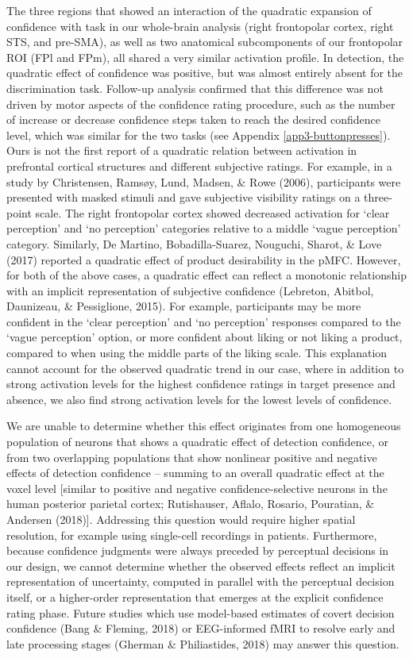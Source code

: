 \documentclass[12pt,twoside]{reedthesis}
\begin{document}
The three regions that showed an interaction of the quadratic expansion of confidence with task in our whole-brain analysis (right frontopolar cortex, right STS, and pre-SMA), as well as two anatomical subcomponents of our frontopolar ROI (FPl and FPm), all shared a very similar activation profile. In detection, the quadratic effect of confidence was positive, but was almost entirely absent for the discrimination task. Follow-up analysis confirmed that this difference was not driven by motor aspects of the confidence rating procedure, such as the number of increase or decrease confidence steps taken to reach the desired confidence level, which was similar for the two tasks (see Appendix \ref{app3-buttonpresses}). Ours is not the first report of a quadratic relation between activation in prefrontal cortical structures and different subjective ratings. For example, in a study by Christensen, Ramsøy, Lund, Madsen, \& Rowe (2006), participants were presented with masked stimuli and gave subjective visibility ratings on a three-point scale. The right frontopolar cortex showed decreased activation for `clear perception' and `no perception' categories relative to a middle `vague perception' category. Similarly, De Martino, Bobadilla-Suarez, Nouguchi, Sharot, \& Love (2017) reported a quadratic effect of product desirability in the pMFC. However, for both of the above cases, a quadratic effect can reflect a monotonic relationship with an implicit representation of subjective confidence (Lebreton, Abitbol, Daunizeau, \& Pessiglione, 2015). For example, participants may be more confident in the `clear perception' and `no perception' responses compared to the `vague perception' option, or more confident about liking or not liking a product, compared to when using the middle parts of the liking scale. This explanation cannot account for the observed quadratic trend in our case, where in addition to strong activation levels for the highest confidence ratings in target presence and absence, we also find strong activation levels for the lowest levels of confidence.

We are unable to determine whether this effect originates from one homogeneous population of neurons that shows a quadratic effect of detection confidence, or from two overlapping populations that show nonlinear positive and negative effects of detection confidence -- summing to an overall quadratic effect at the voxel level {[}similar to positive and negative confidence-selective neurons in the human posterior parietal cortex; Rutishauser, Aflalo, Rosario, Pouratian, \& Andersen (2018){]}. Addressing this question would require higher spatial resolution, for example using single-cell recordings in patients. Furthermore, because confidence judgments were always preceded by perceptual decisions in our design, we cannot determine whether the observed effects reflect an implicit representation of uncertainty, computed in parallel with the perceptual decision itself, or a higher-order representation that emerges at the explicit confidence rating phase. Future studies which use model-based estimates of covert decision confidence (Bang \& Fleming, 2018) or EEG-informed fMRI to resolve early and late processing stages (Gherman \& Philiastides, 2018) may answer this question.
\end{document}
